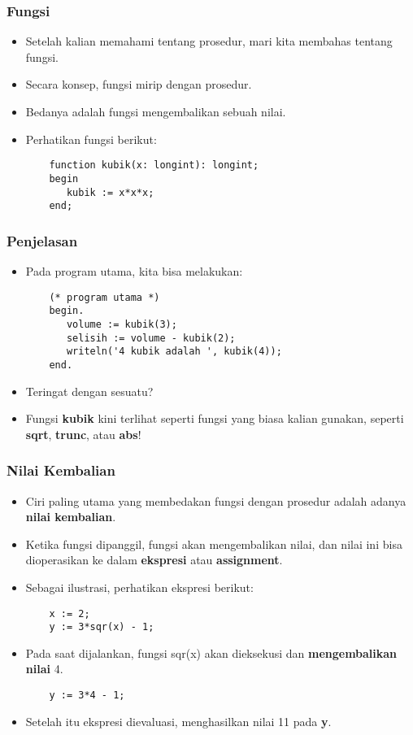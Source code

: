\documentclass{beamer}
\begin{document}
\begin{frame}[fragile]
\frametitle{Fungsi}
\begin{itemize}
	\item Setelah kalian memahami tentang prosedur, mari kita membahas tentang fungsi.
	\item Secara konsep, fungsi mirip dengan prosedur.
	\item Bedanya adalah fungsi \alert{mengembalikan sebuah nilai}.
	\item Perhatikan fungsi berikut:
	\begin{lstlisting}
	function kubik(x: longint): longint;
	begin
	   kubik := x*x*x;
	end;
	\end{lstlisting}
\end{itemize}
\end{frame}

\begin{frame}[fragile]
\frametitle{Penjelasan}
\begin{itemize}
	\item Pada program utama, kita bisa melakukan:
	\begin{lstlisting}
	(* program utama *)
	begin.
	   volume := kubik(3);
	   selisih := volume - kubik(2);
	   writeln('4 kubik adalah ', kubik(4));
	end.
	\end{lstlisting}
	\item Teringat dengan sesuatu?
	\item Fungsi \textbf{kubik} kini terlihat seperti fungsi yang biasa kalian gunakan, seperti \textbf{sqrt}, \textbf{trunc}, atau \textbf{abs}! 
\end{itemize}
\end{frame}

\begin{frame}[fragile]
\frametitle{Nilai Kembalian}
\begin{itemize}
	\item Ciri paling utama yang membedakan fungsi dengan prosedur adalah adanya \textbf{nilai kembalian}.
	\item Ketika fungsi dipanggil, fungsi akan mengembalikan nilai, dan nilai ini bisa dioperasikan ke dalam \textbf{ekspresi} atau \textbf{assignment}.
	\item Sebagai ilustrasi, perhatikan ekspresi berikut:
	\begin{lstlisting}
	x := 2;
	y := 3*sqr(x) - 1;
	\end{lstlisting}
	\item Pada saat dijalankan, fungsi sqr(x) akan dieksekusi dan \textbf{mengembalikan nilai} 4.
	\begin{lstlisting}
	y := 3*4 - 1;
	\end{lstlisting}
	\item Setelah itu ekspresi dievaluasi, menghasilkan nilai 11 pada \textbf{y}.
\end{itemize}
\end{frame}
\end{document}
